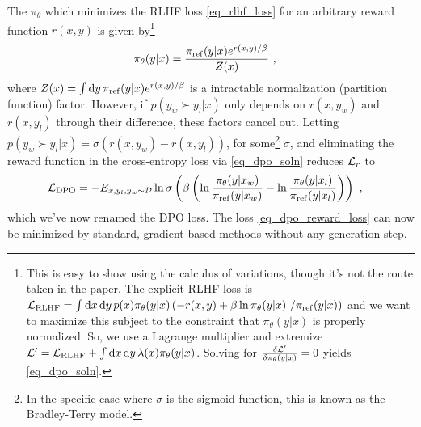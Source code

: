 The $ \pi _{ \theta  } $ which minimizes the RLHF loss \eqref{eq_rlhf_loss} for
an arbitrary reward function $ r(x, y) $ is given by\footnote{This is easy to show using the
calculus of variations, though it's not the route taken in the paper. The explicit RLHF loss is $
\mathcal{L} _{ {\rm RLHF} } = \int {\rm d} x\,{\rm d} y\,p(x) \pi _{ \theta  }(y|x)\left ( -r(x,y) +\beta \ln \pi _{
\theta }(y|x)\ /\pi _{ {\rm ref} }(y|x) \right )  $ and we want to maximize this subject to the
constraint that $ \pi _{ \theta  }(y|x) $ is properly normalized. So, we use a Lagrange multiplier
and extremize $ \mathcal{L}'  = \mathcal{L} _{ {\rm RLHF} }+ \int {\rm d} x\,{\rm d} y\, \lambda (x) \pi _{ \theta
}(y|x)   $. Solving for $ \frac{ \delta \mathcal{L} ' }{ \delta \pi _{ \theta  } (y|x)} =0$ yields
\eqref{eq_dpo_soln}.
}
\begin{align}
\pi _{\theta}(y|x) &= \frac{ \pi _{ {\rm ref}} (y|x)e ^{ r(x, y)/ \beta  }  }{ Z(x) } \ ,\label{eq_dpo_soln}
\end{align}
where $ Z(x) = \int {\rm d} y\, \pi _{ {\rm ref} }(y|x)e^{ r(x, y)/ \beta  }$ is a intractable
normalization (partition function) factor. However, if  $p(y _{ w } \succ y _{ l }| x )$ only
depends on $ r(x, y _{ w }) $ and $ r(x, y _{ l }) $ through their difference, these factors cancel
out. Letting $ p(y _{ w } \succ y _{ l }| x ) = \sigma ( r(x, y _{ w })- r(x, y _{ l }) ) $, for
some\footnote{In the specific case where $ \sigma  $ is the sigmoid function, this is known as the
Bradley-Terry model.} $ \sigma  $, and eliminating the reward function in the cross-entropy loss via
\eqref{eq_dpo_soln} reduces $ \mathcal{L} _{ r } $ to
\begin{align}
    \mathcal{L} _{ {\rm DPO} } &= -E _{ x, y _{ l }, y _{ w } \sim \mathcal{D} } \ln \sigma \left (\beta \left (\ln \frac{ \pi _{
\theta }(y|x _{ w }) }{ \pi _{ {\rm ref} }(y|x _{ w }) }-\ln \frac{ \pi _{ \theta }(y|x _{ l }) }{ \pi
_{ {\rm ref} }(y|x _{  l}) }  \right )\right ) \ , \label{eq_dpo_reward_loss}
\end{align}
which we've now renamed the DPO loss.   The loss \eqref{eq_dpo_reward_loss} can now be minimized by
standard, gradient based methods without any generation step.





